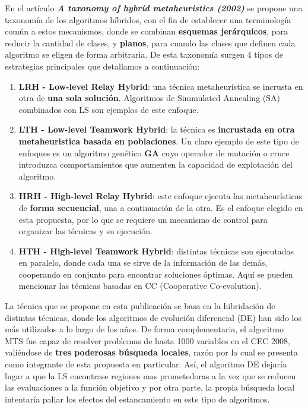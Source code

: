 En el artículo \textbf{\textit{A taxonomy of hybrid metaheuristics (2002)}	}\cite{TaxonomyEAs} se propone una taxonomía de los algoritmos híbridos, con el fin de establecer una terminología común a estos mecanismos, donde se combinan \textbf{esquemas jerárquicos}, para reducir la cantidad de clases, y \textbf{planos}, para cuando las clases que definen cada algoritmo se eligen de forma arbitraria. De esta taxonomía surgen 4 tipos de estrategias principales que detallamos a continuación:

\begin{enumerate}
	\item \textbf{LRH - Low-level Relay Hybrid}: una técnica metaheurística se incrusta en otra de \textbf{una sola solución}. Algoritmos de Simmulated Annealing (SA) combinados con LS son ejemplos de este enfoque.
	
	\item \textbf{LTH - Low-level Teamwork Hybrid}: la técnica es \textbf{incrustada en otra metaheuristica basada en poblaciones}. Un claro ejemplo de este tipo de enfoques es un algoritmo genético \textbf{GA} cuyo operador de mutación o cruce introduzca comportamientos que aumenten la capacidad de explotación del algoritmo.
	
	\item \textbf{HRH - High-level Relay Hybrid}: este enfoque ejecuta las metaheurísticas de \textbf{forma secuencial}, una a continuación de la otra. Es el enfoque elegido en esta propuesta, por lo que se requiere un mecanismo de control para organizar las técnicas y su ejecución.
	
	\item \textbf{HTH - High-level Teamwork Hybrid}: distintas técnicas son ejecutadas en paralelo, donde cada una se sirve de la información de las demás, cooperando en conjunto para encontrar soluciones óptimas. Aquí se pueden mencionar las técnicas basadas en CC (Cooperative Co-evolution).
\end{enumerate}

La técnica que se propone en esta publicación se basa en la hibridación de distintas técnicas, donde los algoritmos de evolución diferencial (DE) han sido los más utilizados a lo largo de los años. De forma complementaria, el algoritmo MTS\cite{MTS-LSGO} fue capaz de resolver problemas de hasta 1000 variables en el CEC 2008, valiéndose de \textbf{tres poderosas búsqueda locales}, razón por la cual se presenta como integrante de esta propuesta en particular. Así, el algoritmo DE dejaría lugar a que la LS encontrase regiones mas prometedoras a la vez que se reducen las evaluaciones a la función objetivo y por otra parte, la propia búsqueda local intentaría paliar los efectos del estancamiento en este tipo de algoritmos.

